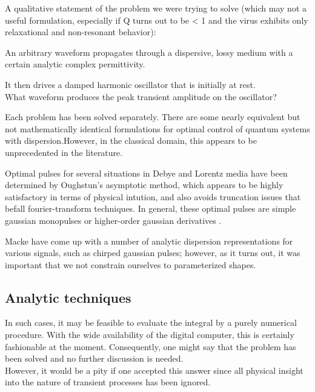\documentclass[paper.tex]{subfiles}
\begin{document}

\pagebreak
A qualitative statement of the problem we were trying to solve (which may not a useful formulation, especially if Q turns out to be < 1 and the virus exhibits only relaxational and non-resonant behavior):

\begin{toolchain}
An arbitrary waveform propagates through a dispersive, lossy medium with a certain analytic complex 
permittivity. 

It then drives a damped harmonic oscillator that is initially at rest.\\

What waveform produces the peak transient amplitude on the oscillator?
\end{toolchain}


Each problem has been solved separately. There are some nearly equivalent but not mathematically identical formulations for optimal control of quantum systems with dispersion.\footnotemark However, in the classical domain, this appears to be unprecedented in the literature.



Optimal pulses for several situations in Debye and Lorentz media have been determined by Oughstun's asymptotic method, which appears to be highly satisfactory in terms of physical intution, and also avoids truncation issues that befall fourier-transform techniques. In general, these optimal pulses are simple gaussian monopulses or higher-order gaussian derivatives \cite{Optimal2017} \cite{Optimal2015}. 

Macke \cite{Simple2012} have come up with a number of analytic dispersion representations for various signals, such as chirped gaussian pulses; however, as it turns out, it was important that we not constrain ourselves to parameterized shapes.


\subsection{Analytic techniques}


\begin{fquote}
	In such cases, it may be feasible to evaluate the integral by a purely numerical procedure. With the wide availability of the digital computer, this is certainly fashionable at the moment. Consequently, one might say that the problem has been solved and no further discussion is needed. \\
	
	However, it would be a pity if one accepted this answer since all physical insight into the nature of transient processes has been ignored. 
\end{fquote}
\end{document}
